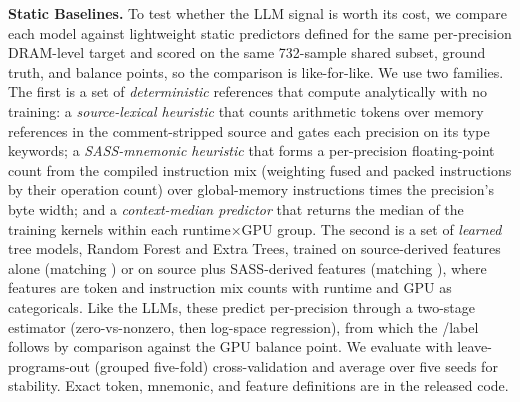 \noindent\textbf{Static Baselines.}
To test whether the LLM signal is worth its cost, we compare each model against lightweight static predictors defined for the same per-precision DRAM-level target and scored on the same 732-sample shared subset, ground truth, and balance points, so the comparison is like-for-like.
We use two families.
The first is a set of \textit{deterministic} references that compute \rai analytically with no training: a \textit{source-lexical heuristic} that counts arithmetic tokens over memory references in the comment-stripped source and gates each precision on its type keywords; a \textit{SASS-mnemonic heuristic} that forms a per-precision floating-point count from the compiled instruction mix (weighting fused and packed instructions by their operation count) over global-memory instructions times the precision's byte width; and a \textit{context-median predictor} that returns the median \rai of the training kernels within each runtime$\times$GPU group.
The second is a set of \textit{learned} tree models, Random Forest and Extra Trees, trained on source-derived features alone (matching \sourceonly) or on source plus SASS-derived features (matching \sourcesass), where features are token and instruction mix counts with runtime and GPU as categoricals.
Like the LLMs, these predict per-precision \rai through a two-stage estimator (zero-vs-nonzero, then log-space regression), from which the \bandwidthbound/\computebound label follows by comparison against the GPU balance point.
We evaluate with leave-programs-out (grouped five-fold) cross-validation and average over five seeds for stability.
Exact token, mnemonic, and feature definitions are in the released code.








